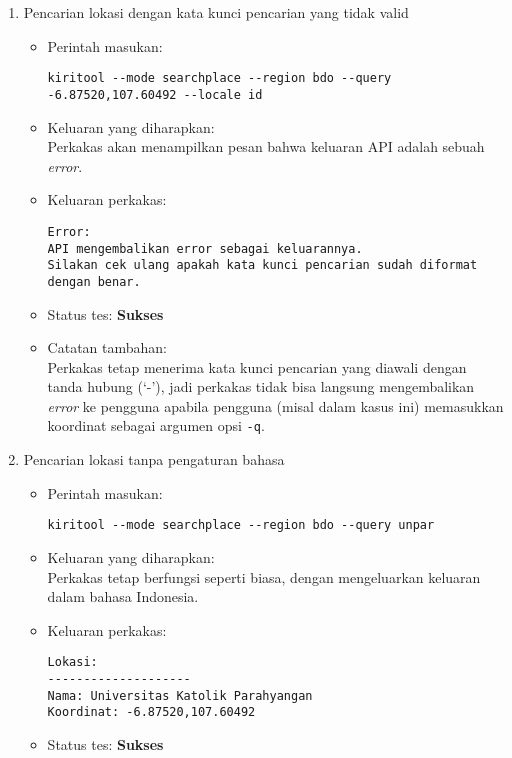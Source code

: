 \begin{enumerate}
	\item Pencarian lokasi dengan kata kunci pencarian yang tidak valid
	\begin{itemize}
		\item Perintah masukan:
		\begin{lstlisting}
kiritool --mode searchplace --region bdo --query -6.87520,107.60492 --locale id
		\end{lstlisting}
		\item Keluaran yang diharapkan: \\
		Perkakas akan menampilkan pesan bahwa keluaran API adalah sebuah \textit{error}.
		\item Keluaran perkakas:
		\begin{lstlisting}
Error:
API mengembalikan error sebagai keluarannya.
Silakan cek ulang apakah kata kunci pencarian sudah diformat dengan benar.
		\end{lstlisting}
		\item Status tes: \textbf{Sukses}
		\item Catatan tambahan: \\
		Perkakas tetap menerima kata kunci pencarian yang diawali dengan tanda hubung (`-'), jadi perkakas tidak bisa langsung mengembalikan \textit{error} ke pengguna apabila pengguna (misal dalam kasus ini) memasukkan koordinat \latlon sebagai argumen opsi \verb|-q|.
	\end{itemize}
	
	\item Pencarian lokasi tanpa pengaturan bahasa
	\begin{itemize}
		\item Perintah masukan:
		\begin{lstlisting}
kiritool --mode searchplace --region bdo --query unpar
		\end{lstlisting}
		\item Keluaran yang diharapkan: \\
		Perkakas tetap berfungsi seperti biasa, dengan mengeluarkan keluaran dalam bahasa Indonesia.
		\item Keluaran perkakas:
		\begin{lstlisting}
Lokasi:
--------------------
Nama: Universitas Katolik Parahyangan
Koordinat: -6.87520,107.60492
		\end{lstlisting}
		\item Status tes: \textbf{Sukses}
	\end{itemize}
	

\end{enumerate}
